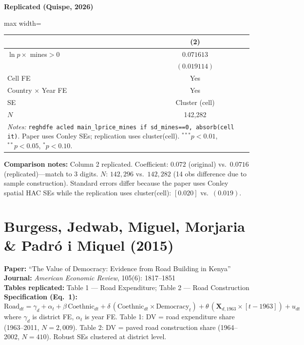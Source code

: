 \documentclass[11pt,a4paper]{article}
\begin{document}
\begin{minipage}[t]{0.48\textwidth}
\centering
\textbf{\large Replicated (Quispe, 2026)}
\vspace{0.3cm}

\begin{adjustbox}{max width=\textwidth}
\begin{tabular}{lc}
\toprule
 & (2) \\
\midrule
$\ln p \times$ mines$>$0 & $0.071613$ \\
 & $(0.019114)$ \\[0.3em]
\midrule
Cell FE & Yes \\
Country $\times$ Year FE & Yes \\
SE & Cluster (cell) \\
$N$ & 142,282 \\
\bottomrule
\multicolumn{2}{p{0.95\textwidth}}{\footnotesize\textit{Notes:} \texttt{reghdfe acled main\_lprice\_mines if sd\_mines==0, absorb(cell it)}. Paper uses Conley SEs; replication uses cluster(cell). $^{***}p<0.01$, $^{**}p<0.05$, $^{*}p<0.10$.}
\end{tabular}
\end{adjustbox}
\end{minipage}

\vspace{1cm}
\textbf{Comparison notes:} Column 2 replicated. Coefficient: $0.072$ (original) vs.\ $0.0716$ (replicated)---match to 3 digits. $N$: $142{,}296$ vs.\ $142{,}282$ (14 obs difference due to sample construction). Standard errors differ because the paper uses Conley spatial HAC SEs while the replication uses cluster(cell): $[0.020]$ vs.\ $(0.019)$.

\newpage

\section{Burgess, Jedwab, Miguel, Morjaria \& Padr\'o i Miquel (2015)}

\textbf{Paper:} ``The Value of Democracy: Evidence from Road Building in Kenya''\\
\textbf{Journal:} \textit{American Economic Review}, 105(6): 1817--1851\\
\textbf{Tables replicated:} Table 1 --- Road Expenditure; Table 2 --- Road Construction\\
\textbf{Specification (Eq.\ 1):}
\[
\text{Road}_{dt} = \gamma_d + \alpha_t + \beta\,\text{Coethnic}_{dt} + \delta\,(\text{Coethnic}_{dt} \times \text{Democracy}_t) + \theta\,(\mathbf{X}_{d,1963} \times [t - 1963]) + u_{dt}
\]
where $\gamma_d$ is district FE, $\alpha_t$ is year FE. Table 1: DV = road expenditure share (1963--2011, $N=2{,}009$). Table 2: DV = paved road construction share (1964--2002, $N=410$). Robust SEs clustered at district level.
\end{document}
